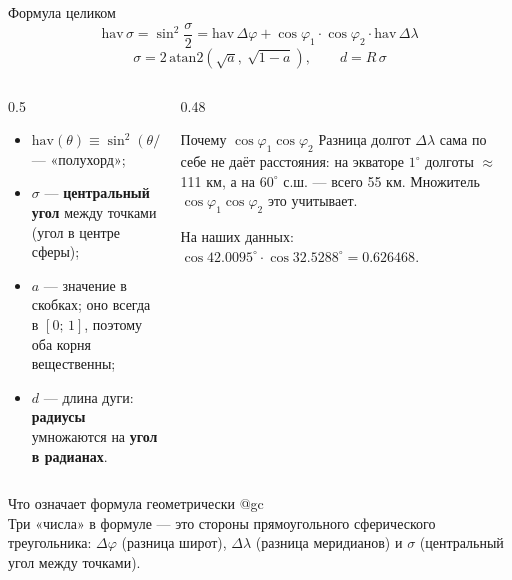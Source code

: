 \documentclass[aspectratio=169,10pt]{beamer}
\makeatletter
\newcommand{\usePic}[1]{\expandafter\csname pic@#1\endcsname}
\makeatother
\begin{document}
\begin{frame}{Формула целиком}
\begin{equation*}
  \mathrm{hav}\,\sigma = \sin^2\frac{\sigma}{2}
  = \mathrm{hav}\,\Delta\varphi
  + \cos\varphi_1 \cdot \cos\varphi_2 \cdot \mathrm{hav}\,\Delta\lambda
\end{equation*}
\begin{equation*}
  \sigma = 2\,\mathrm{atan2}\!\left(\sqrt{a},\ \sqrt{1-a}\right),
  \qquad d = R\,\sigma
\end{equation*}

\vspace{0.4em}
\footnotesize
\begin{columns}[T,onlytextwidth]
  \begin{column}{0.5\textwidth}
    \begin{itemize}\itemsep1pt
      \item $\mathrm{hav}(\theta)\equiv\sin^2(\theta/2)$ --- «полухорд»;
      \item $\sigma$ --- \textbf{центральный угол} между точками
            (угол в центре сферы);
      \item $a$ --- значение в скобках; оно всегда в $[0;\,1]$,
            поэтому оба корня вещественны;
      \item $d$ --- длина дуги: \textbf{радиусы} умножаются на
            \textbf{угол в радианах}.
    \end{itemize}
  \end{column}
  \begin{column}{0.48\textwidth}
    \begin{block}{Почему $\cos\varphi_1\cos\varphi_2$}\small
      Разница долгот $\Delta\lambda$ сама по себе не даёт расстояния:
      на экваторе $1^\circ$ долготы $\approx$ 111 км, а на $60^\circ$
      с.ш. --- всего 55 км. Множитель $\cos\varphi_1\cos\varphi_2$ это
      учитывает.
      \medskip

      На наших данных:
      $\cos 42.0095^\circ\cdot\cos 32.5288^\circ = 0.626468$.
    \end{block}
  \end{column}
\end{columns}
\end{frame}

\begin{frame}{Что означает формула геометрически}
\centering
\usePic{gc}\\[0.1cm]
\footnotesize
Три «числа» в формуле --- это стороны прямоугольного сферического
треугольника: $\Delta\varphi$ (разница широт), $\Delta\lambda$ (разница
меридианов) и $\sigma$ (центральный угол между точками).
\end{frame}
\end{document}
